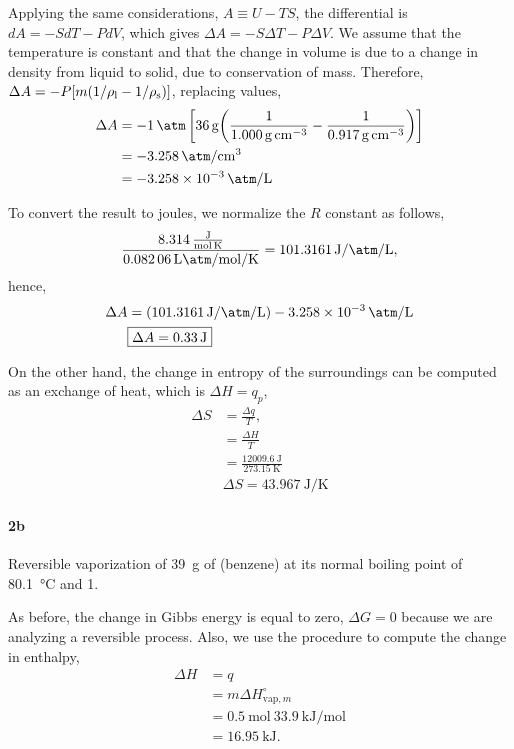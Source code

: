 \documentclass[main.tex]{subfiles}
\begin{document}
Applying the same considerations, $A\equiv U -TS$, the differential is $dA=-S dT - P dV$, which gives $\Delta A = -S\Delta T - P \Delta V$.
We assume that the temperature is constant and that the change in volume is due to a change in density from liquid to solid, due to conservation of mass.
Therefore, $\Delta A = -P\qty[m\qty(1/\rho_{\mathrm{l}}-1/\rho_{\mathrm{s}})]$, replacing values,
\begin{align*}
    \Delta A &= -\SI{1}{\atm}\left[\SI{36}{\gram}\qty(\frac{1}{\SI{1.000}{\gram\per\centi\meter\tothe{3}}}-\frac{1}{\SI{0.917}{\gram\per\centi\meter\tothe{3}}})\right]\\
    &= -\SI{3.258}{\atm\per\centi\meter\tothe{3}} \\
    &= -\SI{3.258d-3}{\atm\per\liter}
\end{align*}

To convert the result to joules, we normalize the $R$ constant as follows,
\begin{gather*}
    \frac{\SI[per-mode=fraction]{8.314}{\joule\per\mole\per\kelvin}}{\SI[per-mode=fraction]{0.08206}{\liter\atm\per\mole\per\kelvin}} =\SI[per-mode=fraction]{101.3161}{\joule\per\atm\per\liter},
\end{gather*}
hence,
\begin{align*}
    \Delta A &=\qty(\SI[per-mode=fraction]{101.3161}{\joule\per\atm\per\liter}) -\SI[per-mode=fraction]{3.258d-3}{\atm\per\liter} \\
    &\boxed{\Delta A = \SI{0.33}{\joule}} 
\end{align*}

On the other hand, the change in entropy of the surroundings can be computed as an exchange of heat, which is $\Delta H = q_p$,
\begin{align*}
    \Delta S &= \frac{\Delta q}{T}, \\
    &= \frac{\Delta H}{T} \\
    &= \frac{\SI{12009.6}{\joule}}{\SI{273.15}{\kelvin}} \\
    &\boxed{\Delta S= \SI[per-mode=fraction]{43.967}{\joule\per\kelvin}}
\end{align*}


\paragraph{2b} Reversible vaporization of \SI{39}{\gram} of  (benzene) at its normal boiling point of \SI{80.1}{\celsius} and \SI{1}{\atm}.

As before, the change in Gibbs energy is equal to zero, $\boxed{\Delta G=0}$ because we are analyzing a reversible process.
Also, we use the procedure to compute the change in enthalpy,
\begin{align*}
    \Delta H &= q \\
    &= m\Delta H_{\mathrm{vap},m}^\circ \\
    &= \SI{0.5}{\mole}~\SI[per-mode=fraction]{33.9}{\kilo\joule\per\mole} \\
    &= \SI{16.95}{\kilo\joule}.
\end{align*}
\end{document}
